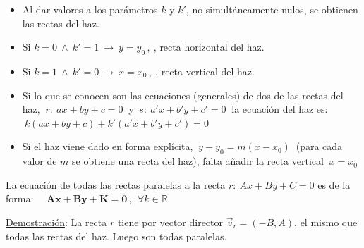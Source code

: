 \begin{itemize}
	\item Al dar valores a los parámetros $k$ y $k'$, no simultáneamente nulos, se obtienen las rectas del haz.
	\item Si $k=0 \ \wedge \ k'=1 \ \to \ y=y_0\, , \ $, recta horizontal del haz.
	\item Si $k=1 \ \wedge \ k'=0 \ \to \ x=x_0\, , \ $, recta vertical del haz.
	\item Si lo que se conocen son las ecuaciones (generales) de dos de las rectas del haz, $\ r:	\ ax+by+c=0\ $ y $\ s:\ a'x+b'y+c'=0 \ $ la ecuación del haz es: $\ k(ax+by+c)+k'(a'x+b'y+c')=0$
	\item Si el haz viene dado en forma explícita, $\ y-y_0=m(x-x_0)\ $ \textcolor{gris}{(para cada valor de $m$ se obtiene una recta del haz)}, falta añadir la recta vertical $\ x=x_0$
\end{itemize}

\vspace{5mm}
\begin{theorem}

La ecuación de todas las rectas paralelas a la recta $r:\ Ax+By+C=0$ es de la forma: $\quad \boldsymbol{Ax+By+K=0}\, , \ \ \forall k\in \mathbb R$	
\end{theorem}

\underline{Demostración}: La recta $r$ tiene por vector director $\vec v_r=(-B,A)$, el mismo que todas las rectas del haz. Luego son todas paralelas. \QED


